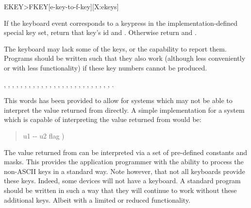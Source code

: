 \begin{worddef}[EKEYtoFKEY]{}{EKEY>FKEY}[e-key-to-f-key][X:ekeys]
\item {}

	If the keyboard event  corresponds to a keypress in the
	implementation-defined special key set, return that key's id
	 and . Otherwise return  and
	.

\note
	The keyboard may lack some of the keys, or the capability to report
	them. Programs should be written such that they also work (although
	less conveniently or with less functionality) if these key numbers
	cannot be produced.

\see {},
	,
	,
	,
	,
	,
	,
	,
	,
	,
	,
	,
	,
	,
	,
	,
	,
	,
	,
	,
	,
	,
	,
	,
	,
	,
	.


	\begin{rationale} %
		This words has been provided to allow for systems which may not
		be able to interpret the value returned from 
		directly. A simple implementation for a system which is capable
		of interpreting the value returned from  would be:

		\begin{quote}
			\ttfamily
			\word{:}   u1 -{}- u2 flag ) \\
			\tab {}    \word{;}
		\end{quote}

		The value returned from  can be interpreted
		via a set of pre-defined constants and masks. This provides
		the application programmer with the ability to process the
		non-ASCII keys in a standard way. Note however, that not all
		keyboards provide these keys. Indeed, some devices will not
		have a keyboard. A standard program should be written in such
		a way that they will continue to work without these additional
		keys. Albeit with a limited or reduced functionality.


\end{rationale}
\end{worddef}
